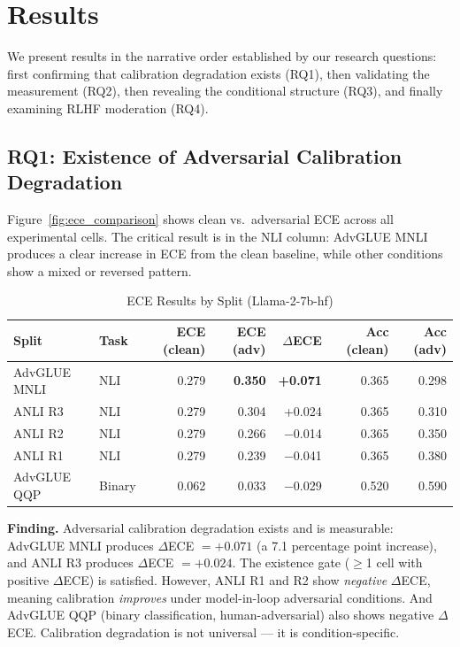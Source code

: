 \section{Results}
\label{sec:results}

We present results in the narrative order established by our research questions: first confirming that calibration degradation exists (RQ1), then validating the measurement (RQ2), then revealing the conditional structure (RQ3), and finally examining RLHF moderation (RQ4).

\subsection{RQ1: Existence of Adversarial Calibration Degradation}

Figure~\ref{fig:ece_comparison} shows clean vs.\ adversarial ECE across all experimental cells. The critical result is in the NLI column: AdvGLUE MNLI produces a clear increase in ECE from the clean baseline, while other conditions show a mixed or reversed pattern.

\begin{table}[h]
\centering
\caption{ECE Results by Split (Llama-2-7b-hf)}
\label{tab:ece_results}
\begin{tabular}{llrrrrr}
\toprule
Split & Task & ECE (clean) & ECE (adv) & $\Delta$ECE & Acc (clean) & Acc (adv) \\
\midrule
AdvGLUE MNLI & NLI & 0.279 & \textbf{0.350} & \textbf{+0.071} & 0.365 & 0.298 \\
ANLI R3      & NLI & 0.279 & 0.304 & +0.024 & 0.365 & 0.310 \\
ANLI R2      & NLI & 0.279 & 0.266 & $-$0.014 & 0.365 & 0.350 \\
ANLI R1      & NLI & 0.279 & 0.239 & $-$0.041 & 0.365 & 0.380 \\
AdvGLUE QQP  & Binary & 0.062 & 0.033 & $-$0.029 & 0.520 & 0.590 \\
\bottomrule
\end{tabular}
\end{table}

\textbf{Finding.} Adversarial calibration degradation exists and is measurable: AdvGLUE MNLI produces $\Delta$ECE $= +0.071$ (a 7.1 percentage point increase), and ANLI R3 produces $\Delta$ECE $= +0.024$. The existence gate ($\geq$1 cell with positive $\Delta$ECE) is satisfied. However, ANLI R1 and R2 show \textit{negative} $\Delta$ECE, meaning calibration \textit{improves} under model-in-loop adversarial conditions. And AdvGLUE QQP (binary classification, human-adversarial) also shows negative $\Delta$ECE. Calibration degradation is not universal --- it is condition-specific.

